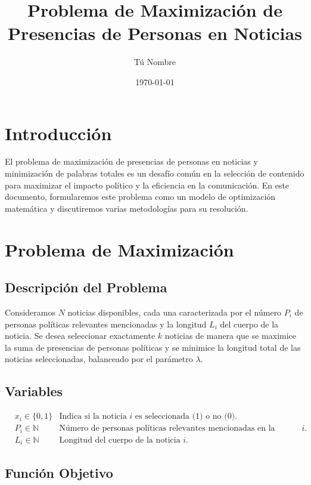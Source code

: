 \documentclass{article}
\title{Problema de Maximización de Presencias de Personas en Noticias}
\author{Tú Nombre}
\date{\today}
\begin{document}
\maketitle

\section*{Introducción}

El problema de maximización de presencias de personas en noticias y minimización de palabras totales es un desafío común en la selección de contenido para maximizar el impacto político y la eficiencia en la comunicación. En este documento, formularemos este problema como un modelo de optimización matemática y discutiremos varias metodologías para su resolución.

\section*{Problema de Maximización}

\subsection*{Descripción del Problema}

Consideramos \( N \) noticias disponibles, cada una caracterizada por el número \( P_i \) de personas políticas relevantes mencionadas y la longitud \( L_i \) del cuerpo de la noticia. Se desea seleccionar exactamente \( k \) noticias de manera que se maximice la suma de presencias de personas políticas y se minimice la longitud total de las noticias seleccionadas, balanceado por el parámetro \( \lambda \).

\subsection*{Variables}

\[
\begin{aligned}
&x_i \in \{0, 1\} & \text{Indica si la noticia } i \text{ es seleccionada (1) o no (0).} \\
&P_i \in \mathbb{N} & \text{Número de personas políticas relevantes mencionadas en la noticia } i. \\
&L_i \in \mathbb{N} & \text{Longitud del cuerpo de la noticia } i.
\end{aligned}
\]

\subsection*{Función Objetivo}
\end{document}
